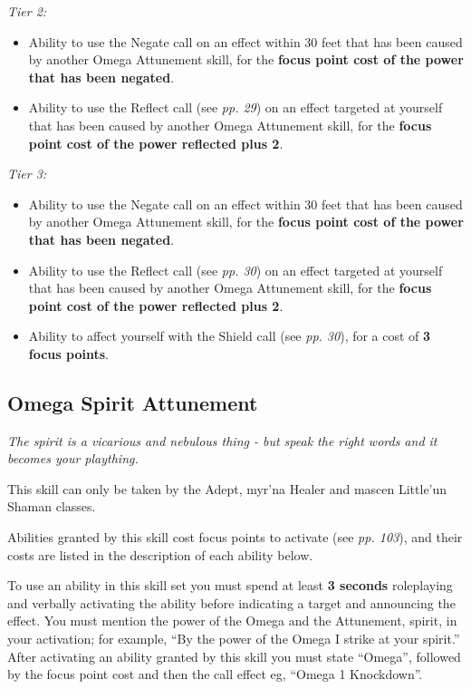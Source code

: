 \textit{Tier 2:}

\begin{itemize}
\item Ability to use the Negate call on an effect within 30 feet that has been caused by another Omega Attunement skill, for the \textbf{focus point cost of the power that has been negated}.

\item Ability to use the Reflect call (see \textit{pp. 29}) on an effect targeted at yourself that has been caused by another Omega Attunement skill, for the \textbf{focus point cost of the power reflected plus 2}.

\end{itemize}
\textit{Tier 3:}

\begin{itemize}
\item Ability to use the Negate call on an effect within 30 feet that has been caused by another Omega Attunement skill, for the \textbf{focus point cost of the power that has been negated}.

\item Ability to use the Reflect call (see \textit{pp. 30}) on an effect targeted at yourself that has been caused by another Omega Attunement skill, for the \textbf{focus point cost of the power reflected plus 2}.

\item Ability to affect yourself with the Shield call (see \textit{pp. 30}), for a cost of \textbf{3 focus points}.

\end{itemize}
\subsection{Omega Spirit Attunement}

\textit{The spirit is a vicarious and nebulous thing - but speak the right words and it becomes your plaything.}

This skill can only be taken by the Adept, myr'na Healer and mascen Little'un Shaman classes.

Abilities granted by this skill cost focus points to activate (see \textit{pp. 103}), and their costs are listed in the description of each ability below.

To use an ability in this skill set you must spend at least \textbf{3 seconds} roleplaying and verbally activating the ability before indicating a target and announcing the effect. You must mention the power of the Omega and the Attunement, spirit, in your activation; for example, ``By the power of the Omega I strike at your spirit.'' After activating an ability granted by this skill you must state ``Omega'', followed by the focus point cost and then the call effect eg, ``Omega 1 Knockdown''.

